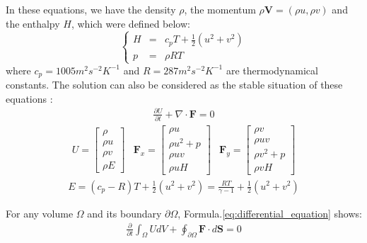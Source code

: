 \documentclass[%
 reprint,
 amsmath,amssymb,
pra,
]{revtex4-1}
\begin{document}
In these equations, we have the density $\rho$, the momentum $\rho\bm{V}=\left(\rho u, \rho v\right)$ and the enthalpy $H$, which were defined below:
\begin{equation}
\left\{
\begin{array}{ccc}
	H & = & c_p T + \frac{1}{2}\left(u^2 + v^2\right)\\
	p & = & \rho R T
\end{array}
\right.
\end{equation}
where $c_p = 1005 m^2 s^{-2} K^{-1}$ and $R = 287 m^2 s^{-2} K^{-1}$ are thermodynamical constants. The solution can also be considered as the stable situation of these equations \cite{hirsch2007numerical}:
\begin{align}\label{eq:differential_equation}
	\frac{\partial U}{\partial t} + \nabla \cdot \bm{F} = 0
\end{align}
\begin{equation}
\begin{array}{ccc}
U = \left[
\begin{array}{c}
\rho\\
\rho u\\
\rho v\\
\rho E
\end{array}
\right]
&
\bm{F}_x = \left[
\begin{array}{c}
\rho u\\
\rho u^2 + p\\
\rho u v\\
\rho u H
\end{array}
\right]
&
\bm{F}_y = \left[
\begin{array}{c}
\rho v\\
\rho u v\\
\rho v^2 + p\\
\rho v H
\end{array}
\right]
\end{array}
\end{equation}
\begin{align}
	E = \left(c_p - R\right) T + \frac{1}{2}\left(u^2 + v^2\right) = \frac{R T}{\gamma - 1} + \frac{1}{2}\left(u^2 + v^2\right)
\end{align}

For any volume $\Omega$ and its boundary $\partial\Omega$, Formula.\ref{eq:differential_equation} shows:
\begin{align}\label{eq:integral_equation}
	\frac{\partial}{\partial t}\int_\Omega U d V + \oint_{\partial \Omega} \bm{F} \cdot d \bm{S} = 0
\end{align}
\end{document}
